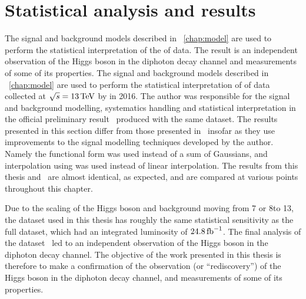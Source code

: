 \chapter{Statistical analysis and results}
\label{chap:statandresults}

\ifNewAnalysis
The signal and background models described in \Chapter~\ref{chap:model} are used to perform the statistical interpretation of the \thisanalysislumi\ifb of data. The result is an independent observation of the Higgs boson in the diphoton decay channel and measurements of some of its properties. %
\else
The signal and background models described in \Chapter~\ref{chap:model} are used to perform the statistical interpretation of \thisanalysislumi\ifb of \RunII data collected at $\sqrt{s}=13\,\text{Te\hspace{-.08em}V}$ by \CMS in 2016. The author was responsible for the signal and background modelling, systematics handling and statistical interpretation in the official \CMS preliminary result~\cite{CMS-PAS-HIG-16-020} produced with the same dataset. The results presented in this section differ from those presented in~\cite{CMS-PAS-HIG-16-020} insofar as they use improvements to the signal modelling techniques developed by the author. Namely the \DCBpG functional form was used instead of a sum of Gaussians, and interpolation using \SSF  was used instead of linear interpolation. The results from this thesis and~\cite{CMS-PAS-HIG-16-020} are almost identical, as expected, and are compared at various points throughout this chapter.

Due to the scaling of the \SM Higgs boson and background \crosssection\s moving from 7 or 8\TeV to 13\TeV, the dataset used in this thesis has roughly the same statistical sensitivity as the full \RunI dataset, which had an integrated luminosity of $24.8\,\text{fb}^{-1}$. The final analysis of the \RunI dataset~\cite{LegacyHgg} led to an independent observation of the Higgs boson in the diphoton decay channel. The objective of the work presented in this thesis is therefore to make a confirmation of the observation (or ``rediscovery'') of the Higgs boson in the diphoton decay channel, and measurements of some of its properties.
\fi

